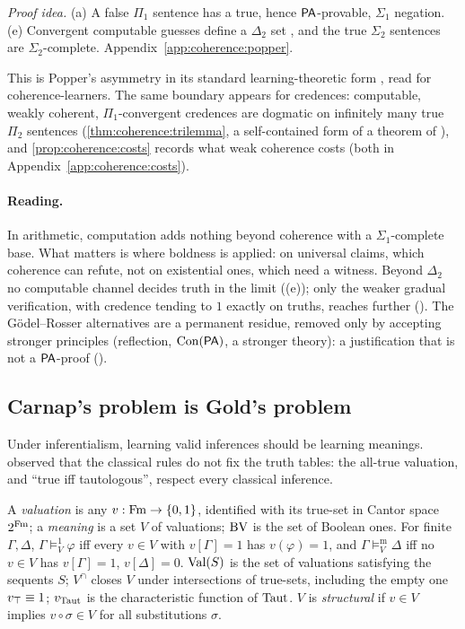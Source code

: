 \noindent\emph{Proof idea.} (a) A false $\Pi_1$ sentence has a true, hence $\mathsf{PA}$-provable, $\Sigma_1$ negation. (e) Convergent computable guesses define a $\Delta_2$ set \citep{shoenfield1959degrees}, and the true $\Sigma_2$ sentences are $\Sigma_2$-complete. Appendix~\ref{app:coherence:popper}.

This is Popper's asymmetry in its standard learning-theoretic form \citep{putnam1965trial,gold1965limiting,kelly1996logic}, read for coherence-learners. The same boundary appears for credences: computable, weakly coherent, $\Pi_1$-convergent credences are dogmatic on infinitely many true $\Pi_2$ sentences (\cref{thm:coherence:trilemma}, a self-contained form of a theorem of \citealt{sawin2013computable}), and \cref{prop:coherence:costs} records what weak coherence costs (both in Appendix~\ref{app:coherence:costs}).

\paragraph{Reading.} In arithmetic, computation adds nothing beyond coherence with a $\Sigma_1$-complete base. What matters is where boldness is applied: on universal claims, which coherence can refute, not on existential ones, which need a witness. Beyond $\Delta_2$ no computable channel decides truth in the limit ((e)); only the weaker gradual verification, with credence tending to $1$ exactly on truths, reaches further (). The G\"odel--Rosser alternatives are a permanent residue, removed only by accepting stronger principles (reflection, $\mathrm{Con}(\mathsf{PA})$, a stronger theory): a justification that is not a $\mathsf{PA}$-proof ().

\subsection{Carnap's problem is Gold's problem}\label{sec:coherence:carnap}

Under inferentialism, learning valid inferences should be learning meanings. \citet{carnap1943formalization} observed that the classical rules do not fix the truth tables: the all-true valuation, and ``true iff tautologous'', respect every classical inference.

\begin{definition}[Meanings]\label{def:coherence:valuations}
A \emph{valuation} is any $v:\mathrm{Fm}\to\{0,1\}$, identified with its true-set in Cantor space $2^{\mathrm{Fm}}$; a \emph{meaning} is a set $V$ of valuations; $\mathrm{BV}$ is the set of Boolean ones. For finite $\Gamma,\Delta$, $\Gamma\models^1_V\varphi$ iff every $v\in V$ with $v[\Gamma]=1$ has $v(\varphi)=1$, and $\Gamma\models^{\mathrm m}_V\Delta$ iff no $v\in V$ has $v[\Gamma]=1$, $v[\Delta]=0$. $\mathrm{Val}(S)$ is the set of valuations satisfying the sequents $S$; $V^\cap$ closes $V$ under intersections of true-sets, including the empty one $v_{\top}\equiv1$; $v_{\mathrm{Taut}}$ is the characteristic function of $\mathrm{Taut}$. $V$ is \emph{structural} if $v\in V$ implies $v\circ\sigma\in V$ for all substitutions $\sigma$.
\end{definition}

